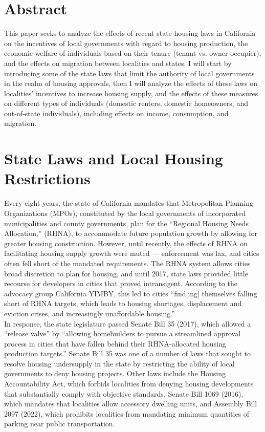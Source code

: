 \documentclass[12pt]{extarticle}
\title{}
\author{Avinash Iyer}
\date{}
\begin{document}
  \doublespacing
  \section*{Abstract}
  This paper seeks to analyze the effects of recent state housing laws in California on the incentives of local governments with regard to housing production, the economic welfare of individuals based on their tenure (tenant vs. owner-occupier), and the effects on migration between localities and states. I will start by introducing some of the state laws that limit the authority of local governments in the realm of housing approvals, then I will analyze the effects of these laws on localities' incentives to increase housing supply, and the effects of these measures on different types of individuals (domestic renters, domestic homeowners, and out-of-state individuals), including effects on income, consumption, and migration.
  \section*{State Laws and Local Housing Restrictions}%
  Every eight years, the state of California mandates that Metropolitan Planning Organizations (MPOs), constituted by the local governments of incorporated municipalities and county governments, plan for the ``Regional Housing Needs Allocation,'' (RHNA), to accommodate future population growth by allowing for greater housing construction. However, until recently, the effects of RHNA on facilitating housing supply growth were muted --- enforcement was lax, and cities often fell short of the mandated requirements. The RHNA system allows cities broad discretion to plan for housing, and until 2017, state laws provided little recourse for developers in cities that proved intransigent. According to the advocacy group California YIMBY, this led to cities ``find[ing] themselves falling short of RHNA targets, which leads to housing shortages, displacement and eviction crises, and increasingly unaffordable housing.''\\

  In response, the state legislature passed Senate Bill 35 (2017), which allowed a ``release valve'' by ``allowing homebuilders to pursue a streamlined approval process in cities that have fallen behind their RHNA-allocated housing production targets.'' Senate Bill 35 was one of a number of laws that sought to resolve housing undersupply in the state by restricting the ability of local governments to deny housing projects. Other laws include the Housing Accountability Act, which forbids localities from denying housing developments that substantially comply with objective standards, Senate Bill 1069 (2016), which mandates that localities allow accessory dwelling units, and Assembly Bill 2097 (2022), which prohibits localities from mandating minimum quantities of parking near public transportation.
\end{document}
